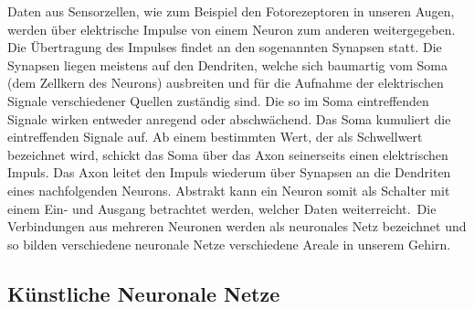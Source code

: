 Daten aus Sensorzellen, wie zum Beispiel den Fotorezeptoren in unseren Augen, werden über elektrische Impulse von einem Neuron zum anderen weitergegeben. Die Übertragung des Impulses findet an den sogenannten Synapsen statt. Die Synapsen liegen meistens auf den Dendriten, welche sich baumartig vom Soma (dem Zellkern des Neurons) ausbreiten und für die Aufnahme der elektrischen Signale verschiedener Quellen zuständig sind. Die so im Soma eintreffenden Signale wirken entweder anregend oder abschwächend. Das Soma kumuliert die eintreffenden Signale auf. Ab einem bestimmten Wert, der als Schwellwert bezeichnet wird, schickt das Soma über das Axon seinerseits einen elektrischen Impuls. Das Axon leitet den Impuls wiederum über Synapsen an die Dendriten eines nachfolgenden Neurons. Abstrakt kann ein Neuron somit als Schalter mit einem Ein- und Ausgang betrachtet werden, welcher Daten weiterreicht.\, Die Verbindungen aus mehreren Neuronen werden als neuronales Netz bezeichnet und so bilden verschiedene neuronale Netze verschiedene Areale in unserem Gehirn. 


\subsection{Künstliche Neuronale Netze}\label{sec:einf_neuro}






